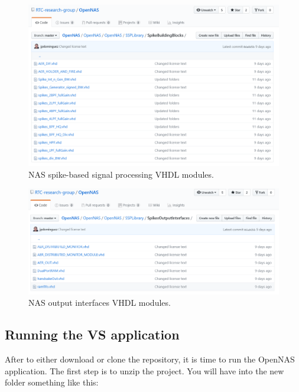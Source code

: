 \begin{figure}[H]
\centering
\includegraphics[width=1\textwidth]{images/Img08_SpikeBuildingBlocks.PNG}
\caption{\label{fig:OpenNAS_SSP_SpikesBuildingBlock}NAS spike-based signal processing VHDL modules.}
\end{figure}

\begin{figure}[H]
\centering
\includegraphics[width=1\textwidth]{images/Img09_SpikesOutputInterfaces.PNG}
\caption{\label{fig:OpenNAS_SpikeOutputInterface}NAS output interfaces VHDL modules.}
\end{figure}


\subsection{Running the VS application}

After to either download or clone the repository, it is time to run the OpenNAS application. The first step is to unzip the project. You will have into the new folder something like this:

